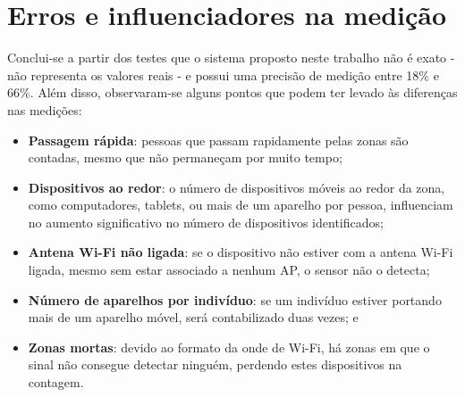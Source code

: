 \section{Erros e influenciadores na medição}
\label{erros-influencia}
Conclui-se a partir dos testes que o sistema proposto neste trabalho não é exato - não
representa os valores reais - e possui uma precisão de medição entre 18\% e
66\%. Além disso, observaram-se alguns pontos que podem ter levado às diferenças nas medições:
\begin{itemize}
    \item \textbf{Passagem rápida}: pessoas que passam rapidamente pelas zonas são contadas, mesmo que não
    permaneçam por muito tempo;
    \item \textbf{Dispositivos ao redor}: o número de dispositivos móveis ao redor da zona, como computadores, tablets,
    ou mais de um aparelho por pessoa, influenciam no aumento significativo no número de dispositivos identificados;
    \item \textbf{Antena Wi-Fi não ligada}: se o dispositivo não estiver com a antena Wi-Fi ligada, mesmo sem
    estar associado a nenhum AP, o sensor não o detecta;
    \item \textbf{Número de aparelhos por indivíduo}: se um indivíduo estiver portando mais de um aparelho
    móvel, será contabilizado duas vezes; e
    \item \textbf{Zonas mortas}: devido ao formato da onde de Wi-Fi, há zonas em que o sinal não consegue
    detectar ninguém, perdendo estes dispositivos na contagem.
\end{itemize}
